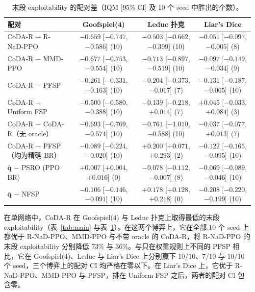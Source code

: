 \documentclass{article}
\theoremstyle{plain}
\theoremstyle{remark}
\newcommand{\bq}{{\bm{q}}}
\newcommand{\codar}{CoDA-R}
\newcommand{\rnad}{R-NaD-PPO}
\begin{document}
\begin{table}[t]
\caption{末段 exploitability 的配对差（IQM [95\% CI] 及 10 个 seed 中胜出的个数）。}
\label{tab:paired}
\begin{center}
\scriptsize
\setlength{\tabcolsep}{2.5pt}
\begin{tabular}{lccc}
\toprule
配对 & Goofspiel(4) & Leduc 扑克 & Liar's Dice \\
\midrule
\codar{} $-$ \rnad{} & $-0.659$ [$-0.747$, $-0.586$] (10) & $-0.503$ [$-0.662$, $-0.399$] (10) & $-0.051$ [$-0.097$, $-0.005$] (8) \\
\codar{} $-$ MMD-PPO & $-0.677$ [$-0.753$, $-0.554$] (10) & $-0.713$ [$-0.897$, $-0.519$] (10) & $-0.097$ [$-0.149$, $-0.034$] (9) \\
\codar{} $-$ PFSP & $-0.261$ [$-0.331$, $-0.163$] (10) & $-0.204$ [$-0.373$, $-0.017$] (7) & $-0.131$ [$-0.187$, $-0.065$] (10) \\
\codar{} $-$ Uniform FSP & $-0.500$ [$-0.580$, $-0.388$] (10) & $-0.139$ [$-0.218$, $+0.014$] (7) & $+0.045$ [$-0.033$, $+0.084$] (3) \\
\codar{} $-$ \codar{}（无 oracle） & $-0.693$ [$-0.769$, $-0.574$] (10) & $-0.761$ [$-1.010$, $-0.588$] (10) & $-0.037$ [$-0.077$, $+0.013$] (7) \\
\codar{} $-$ PFSP（均为精确 BR） & $-0.089$ [$-0.224$, $-0.020$] (10) & $+0.200$ [$+0.071$, $+0.293$] (2) & $-0.122$ [$-0.165$, $-0.095$] (10) \\
$\bar{\bq}$ $-$ PSRO (PPO BR) & $+0.007$ [$+0.004$, $+0.016$] (0) & $-0.078$ [$-0.112$, $-0.007$] (8) & $-0.069$ [$-0.089$, $-0.046$] (10) \\
$\bar{\bq}$ $-$ NFSP & $-0.106$ [$-0.146$, $-0.091$] (10) & $+0.178$ [$+0.128$, $+0.218$] (0) & $-0.208$ [$-0.220$, $-0.199$] (10) \\
\bottomrule
\end{tabular}
\end{center}
\end{table}

在单网络中，\codar{} 在 Goofspiel(4) 与 Leduc 扑克上取得最低的末段 exploitability（表~\ref{tab:main} 与表~\ref{tab:paired}）。在这两个博弈上，它在全部 10 个 seed 上都优于 \rnad{}、MMD-PPO 与不带 oracle 的 \codar{}，将 \rnad{} 的末段 exploitability 分别降低 73\% 与 36\%。与只在权重规则上不同的 PFSP 相比，它在 Goofspiel(4)、Leduc 与 Liar's Dice 上分别赢下 10/10、7/10 与 10/10 个 seed，三个博弈上的配对 CI 均严格在零以下。在 Liar's Dice 上，它优于 \rnad{}、MMD-PPO 与 PFSP，排在 Uniform FSP 之后，两者的配对 CI 包含零。
\end{document}
